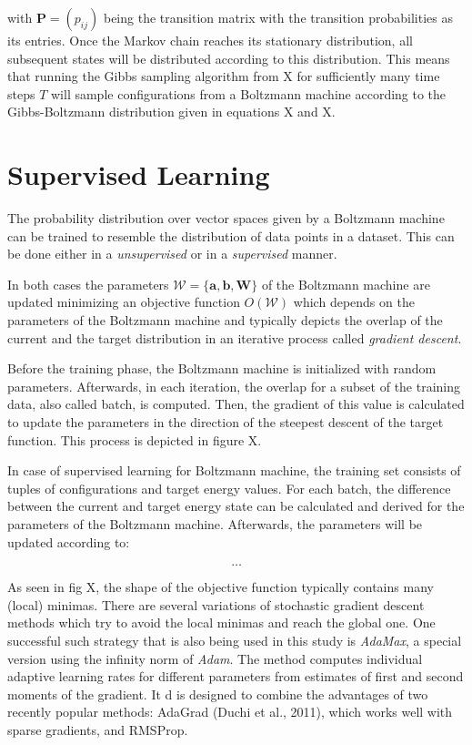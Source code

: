 with $\bm{P} = (p_{ij})$ being the transition matrix with the transition probabilities as its entries.
Once the Markov chain reaches its stationary distribution, all subsequent states will be distributed 
according to this distribution. This means that running the Gibbs sampling algorithm from X for 
sufficiently many time steps $T$ will sample configurations from a Boltzmann machine according 
to the Gibbs-Boltzmann distribution given in equations X and X.
    
\section{Supervised Learning}
The probability distribution over vector spaces given by a Boltzmann machine can be trained to 
resemble the distribution of data points in a dataset. This can be done either in a \textit{unsupervised}
or in a \textit{supervised} manner.

In both cases the parameters $\mathcal{W} = \{\bm{a},\bm{b},\bm{W}\}$ of the Boltzmann machine are updated minimizing 
an objective function $O(\mathcal{W})$ which depends on the parameters of the Boltzmann machine and 
typically depicts the overlap of the current and the target distribution in an iterative process called 
\textit{gradient descent}.

Before the training phase, the Boltzmann machine is initialized with random parameters. Afterwards, in each 
iteration, the overlap for a subset of the training data, also called batch, is computed. Then, the gradient of 
this value is calculated to update the parameters in the direction of the steepest descent of the target function.
This process is depicted in figure X.

In case of supervised learning for Boltzmann machine, the training set consists of tuples of configurations 
and target energy values. For each batch, the difference between the current and target energy state can be 
calculated and derived for the parameters of the Boltzmann machine. Afterwards, the parameters will be updated 
according to:

\begin{equation}
    \dots
\end{equation}

As seen in fig X, the shape of the objective function typically contains many (local) minimas.
There are several variations of stochastic gradient descent methods which try to avoid the local minimas
and reach the global one.
One successful such strategy that is also being used in this study is \textit{AdaMax}, a special version 
using the infinity norm of \textit{Adam}. The method computes individual adaptive learning rates for
different parameters from estimates of first and second moments of the gradient. It d is designed to combine the advantages
of two recently popular methods: AdaGrad (Duchi et al., 2011), which works well with sparse gradients, and RMSProp. 

